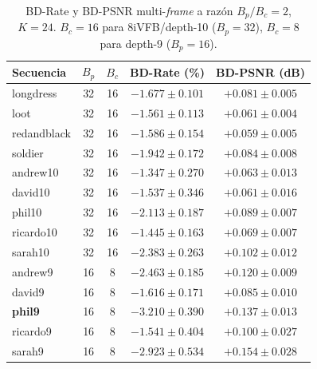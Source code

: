         \begin{table}[H]
            \centering
            \caption{BD-Rate y BD-PSNR multi-\textit{frame} a razón $B_p/B_c=2$, $K=24$. $B_c=16$
            para 8iVFB/depth-10 ($B_p=32$), $B_c=8$ para depth-9 ($B_p=16$).}
            \small
            \begin{tabular}{l|c|c|c|c}
                \hline
                \textbf{Secuencia} & $B_p$ & $B_c$ & \textbf{BD-Rate (\%)} & \textbf{BD-PSNR (dB)} \\
                \hline
                longdress & 32 & 16 & $-1.677 \pm 0.101$ & $+0.081 \pm 0.005$ \\
                loot & 32 & 16 & $-1.561 \pm 0.113$ & $+0.061 \pm 0.004$ \\
                redandblack & 32 & 16 & $-1.586 \pm 0.154$ & $+0.059 \pm 0.005$ \\
                soldier & 32 & 16 & $-1.942 \pm 0.172$ & $+0.084 \pm 0.008$ \\
                andrew10 & 32 & 16 & $-1.347 \pm 0.270$ & $+0.063 \pm 0.013$ \\
                david10 & 32 & 16 & $-1.537 \pm 0.346$ & $+0.061 \pm 0.016$ \\
                phil10 & 32 & 16 & $-2.113 \pm 0.187$ & $+0.089 \pm 0.007$ \\
                ricardo10 & 32 & 16 & $-1.445 \pm 0.163$ & $+0.069 \pm 0.007$ \\
                sarah10 & 32 & 16 & $-2.383 \pm 0.263$ & $+0.102 \pm 0.012$ \\
                andrew9 & 16 & 8 & $-2.463 \pm 0.185$ & $+0.120 \pm 0.009$ \\
                david9 & 16 & 8 & $-1.616 \pm 0.171$ & $+0.085 \pm 0.010$ \\
                \textbf{phil9} & 16 & 8 & $\mathbf{-3.210 \pm 0.390}$ & $\mathbf{+0.137 \pm 0.013}$ \\
                ricardo9 & 16 & 8 & $-1.541 \pm 0.404$ & $+0.100 \pm 0.027$ \\
                sarah9 & 16 & 8 & $-2.923 \pm 0.534$ & $+0.154 \pm 0.028$ \\
                \hline
            \end{tabular}
            \label{tab:e10_bd_ratio2}
        \end{table}

